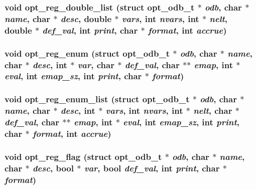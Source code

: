 \subsubsection[{opt\_\-reg\_\-double\_\-list}]{\setlength{\rightskip}{0pt plus 5cm}void opt\_\-reg\_\-double\_\-list (struct {\bf opt\_\-odb\_\-t} $\ast$ {\em odb}, \/  char $\ast$ {\em name}, \/  char $\ast$ {\em desc}, \/  double $\ast$ {\em vars}, \/  int {\em nvars}, \/  int $\ast$ {\em nelt}, \/  double $\ast$ {\em def\_\-val}, \/  int {\em print}, \/  char $\ast$ {\em format}, \/  int {\em accrue})}\label{options_8h_93810182b88f09f4db343557cc4108fe}


\subsubsection[{opt\_\-reg\_\-enum}]{\setlength{\rightskip}{0pt plus 5cm}void opt\_\-reg\_\-enum (struct {\bf opt\_\-odb\_\-t} $\ast$ {\em odb}, \/  char $\ast$ {\em name}, \/  char $\ast$ {\em desc}, \/  int $\ast$ {\em var}, \/  char $\ast$ {\em def\_\-val}, \/  char $\ast$$\ast$ {\em emap}, \/  int $\ast$ {\em eval}, \/  int {\em emap\_\-sz}, \/  int {\em print}, \/  char $\ast$ {\em format})}\label{options_8h_0230cf420485a309bef1424117a63410}


\subsubsection[{opt\_\-reg\_\-enum\_\-list}]{\setlength{\rightskip}{0pt plus 5cm}void opt\_\-reg\_\-enum\_\-list (struct {\bf opt\_\-odb\_\-t} $\ast$ {\em odb}, \/  char $\ast$ {\em name}, \/  char $\ast$ {\em desc}, \/  int $\ast$ {\em vars}, \/  int {\em nvars}, \/  int $\ast$ {\em nelt}, \/  char $\ast$ {\em def\_\-val}, \/  char $\ast$$\ast$ {\em emap}, \/  int $\ast$ {\em eval}, \/  int {\em emap\_\-sz}, \/  int {\em print}, \/  char $\ast$ {\em format}, \/  int {\em accrue})}\label{options_8h_8daa1e40a467b32cf8ccf36880eace16}


\subsubsection[{opt\_\-reg\_\-flag}]{\setlength{\rightskip}{0pt plus 5cm}void opt\_\-reg\_\-flag (struct {\bf opt\_\-odb\_\-t} $\ast$ {\em odb}, \/  char $\ast$ {\em name}, \/  char $\ast$ {\em desc}, \/  bool $\ast$ {\em var}, \/  bool {\em def\_\-val}, \/  int {\em print}, \/  char $\ast$ {\em format})}\label{options_8h_67bace6ae10ed0ee002a5efb379ba300}




